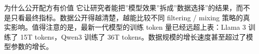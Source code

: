 \begin{knowledgebox}{为什么公开配方有价值}
它让研究者能把”模型效果”拆成”数据选择”的结果，而不是只看最终指标。数据公开得越清楚，越能比较不同 filtering / mixing 策略的真实影响。值得注意的是，最新一代模型的训练 token 量已经远超上表：Llama 3 训练了 15T tokens，Qwen3 训练了 36T tokens。数据规模的增长速度甚至超过了模型参数的增长。
\end{knowledgebox}

